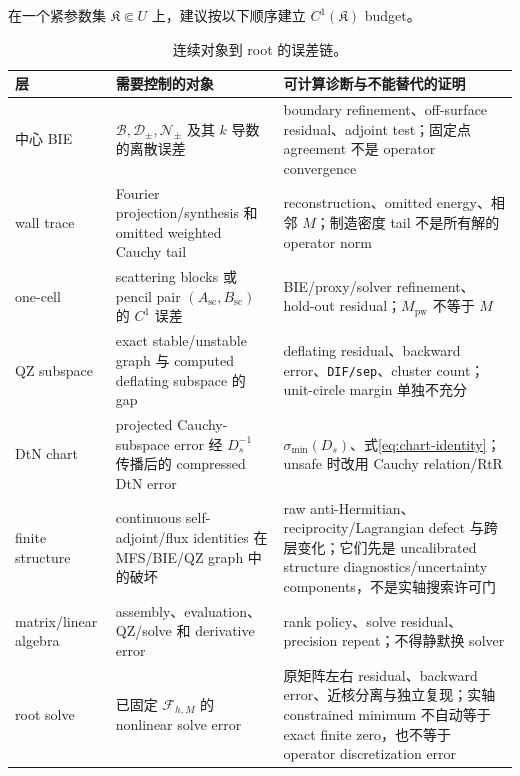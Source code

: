 \documentclass[UTF8,fontset=fandol,11pt,a4paper]{ctexart}
\newcommand{\cF}{\mathcal F}
\newcommand{\cB}{\mathcal B}
\newcommand{\cD}{\mathcal D}
\newcommand{\cN}{\mathcal N}
\begin{document}
在一个紧参数集 $\mathfrak K\Subset U$ 上，建议按以下顺序建立 $C^1(\mathfrak K)$ budget。
\begin{table}[htbp]
  \centering
  \footnotesize
  \caption{连续对象到 root 的误差链。}
  \begin{tabular}{p{}p{}p{}}
    \toprule
    层 & 需要控制的对象 & 可计算诊断与不能替代的证明 \\
    \midrule
    中心 BIE & $\cB,\cD_\pm,\cN_\pm$ 及其 $k$ 导数的离散误差 & boundary refinement、off-surface residual、adjoint test；固定点 agreement 不是 operator convergence \\
    wall trace & Fourier projection/synthesis 和 omitted weighted Cauchy tail & reconstruction、omitted energy、相邻 $M$；制造密度 tail 不是所有解的 operator norm \\
    one-cell & scattering blocks 或 pencil pair $(A_{\mathrm{sc}},B_{\mathrm{sc}})$ 的 $C^1$ 误差 & BIE/proxy/solver refinement、hold-out residual；$M_{\mathrm{pw}}$ 不等于 $M$ \\
    QZ subspace & exact stable/unstable graph 与 computed deflating subspace 的 gap & deflating residual、backward error、\texttt{DIF/sep}、cluster count；unit-circle margin 单独不充分 \\
    DtN chart & projected Cauchy-subspace error 经 $D_s^{-1}$ 传播后的 compressed DtN error & $\sigma_{\min}(D_s)$、式\eqref{eq:chart-identity}；unsafe 时改用 Cauchy relation/RtR \\
    finite structure & continuous self-adjoint/flux identities 在 MFS/BIE/QZ graph 中的破坏 & raw anti-Hermitian、reciprocity/Lagrangian defect 与跨层变化；它们先是 uncalibrated structure diagnostics/uncertainty components，不是实轴搜索许可门 \\
    matrix/linear algebra & assembly、evaluation、QZ/solve 和 derivative error & rank policy、solve residual、precision repeat；不得静默换 solver \\
    root solve & 已固定 $\cF_{h,M}$ 的 nonlinear solve error & 原矩阵左右 residual、backward error、近核分离与独立复现；实轴 constrained minimum 不自动等于 exact finite zero，也不等于 operator discretization error \\
    \bottomrule
  \end{tabular}
\end{table}
\end{document}
